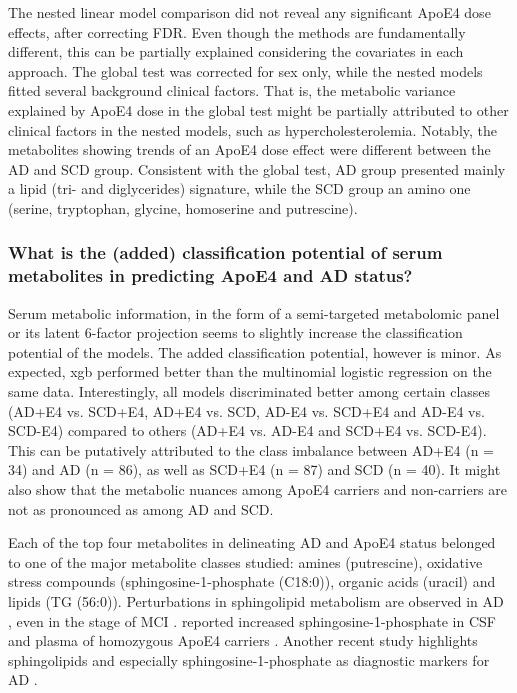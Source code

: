 \documentclass{amsart}
\begin{document}
The nested linear model comparison did not reveal any significant ApoE4 dose effects, after correcting FDR. Even though the methods are fundamentally different, this can be partially explained considering the covariates in each approach. The global test was corrected for sex only, while the nested models fitted several background clinical factors. That is, the metabolic variance explained by ApoE4 dose in the global test might be partially attributed to other clinical factors in the nested models, such as hypercholesterolemia. Notably, the metabolites showing trends of an ApoE4 dose effect were different between the AD and SCD group. Consistent with the global test, AD group presented mainly a lipid (tri- and diglycerides) signature, while the SCD group an amino one (serine, tryptophan, glycine, homoserine and putrescine).

\subsubsection{What is the (added) classification potential of serum metabolites in predicting ApoE4 and AD
status?}
Serum metabolic information, in the form of a semi-targeted metabolomic panel or its latent 6-factor projection seems to slightly increase the classification potential of the models. The added classification potential, however is minor. As expected, \acrshort{xgb} performed better than the multinomial logistic regression on the same data. Interestingly, all models discriminated better among certain classes (AD+E4 vs. SCD+E4, AD+E4 vs. SCD, AD-E4 vs. SCD+E4 and AD-E4 vs. SCD-E4) compared to others (AD+E4 vs. AD-E4 and SCD+E4 vs. SCD-E4). This can be putatively attributed to the class imbalance between AD+E4 (n = 34) and AD (n = 86), as well as SCD+E4 (n = 87) and SCD (n = 40). It might also show that the metabolic nuances among ApoE4 carriers and non-carriers are not as pronounced as among AD and SCD.

Each of the top four metabolites in delineating AD and ApoE4 status belonged to one of the major metabolite classes studied: amines (putrescine), oxidative stress compounds (sphingosine-1-phosphate (C18:0)), organic acids (uracil) and lipids (TG (56:0)). Perturbations in sphingolipid metabolism are observed in AD \cite{mielke2010alterations}, even in the stage of MCI \cite{den2023sphingolipids}.  reported increased sphingosine-1-phosphate in CSF and plasma of homozygous ApoE4 carriers \cite{den2023sphingolipids}. Another recent study highlights sphingolipids and especially sphingosine-1-phosphate as diagnostic markers for AD \cite{d2022sphingolipid}.
\end{document}
